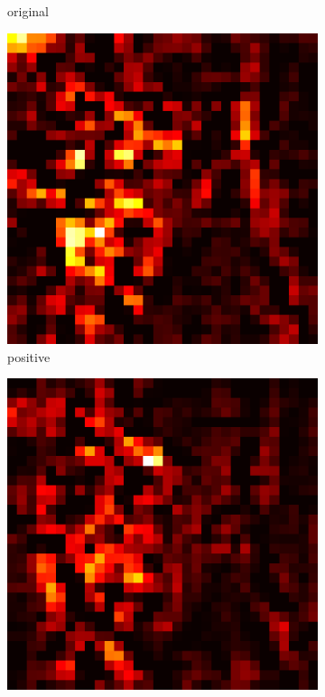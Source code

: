 \documentclass[preprint,12pt]{elsarticle}
\begin{document}
\begin{figure}
\begin{subfigure}{0.14\linewidth}
        \caption{original}
    \end{subfigure}
    \hfill
    \begin{subfigure}{0.14\textwidth}
        \centering
        \includegraphics[width=\linewidth]{../visualizations/examples/cifar10/cnn/positive_saliency_map/2.png}
        \caption{positive}
    \end{subfigure}
    \hfill
    \begin{subfigure}{0.14\textwidth}
        \centering
        \includegraphics[width=\linewidth]{../visualizations/examples/cifar10/cnn/negative_saliency_map/2.png}

\end{subfigure}
\end{figure}
\end{document}
